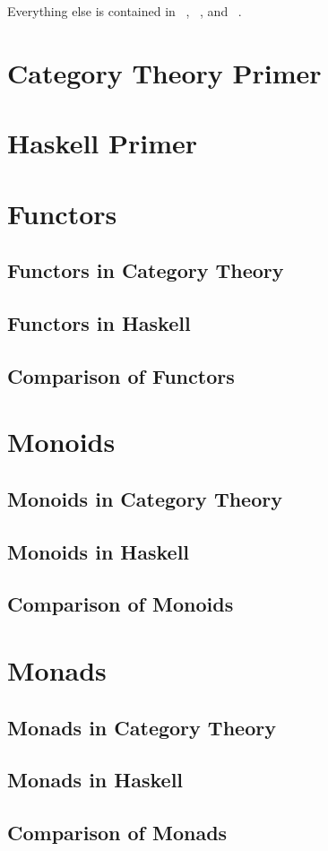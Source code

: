 \documentclass{article}
\begin{document}
Everything else is contained in ~\parencite{RWH}, ~\parencite{ASF}, and ~\parencite{TTT}.
\section{Category Theory Primer}
\section{Haskell Primer}
\section{Functors}
\subsection{Functors in Category Theory}
\subsection{Functors in Haskell}
\subsection{Comparison of Functors}
\section{Monoids}
\subsection{Monoids in Category Theory}
\subsection{Monoids in Haskell}
\subsection{Comparison of Monoids}
\section{Monads}
\subsection{Monads in Category Theory}
\subsection{Monads in Haskell}
\subsection{Comparison of Monads}

\newpage
\printbibliography
\end{document}
